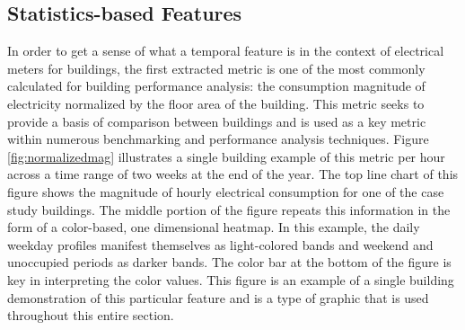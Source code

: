 \subsection{Statistics-based Features}
\label{sec:statisticsfeatures}

In order to get a sense of what a temporal feature is in the context of electrical meters for buildings, the first extracted metric is one of the most commonly calculated for building performance analysis: the consumption magnitude of electricity normalized by the floor area of the building. This metric seeks to provide a basis of comparison between buildings and is used as a key metric within numerous benchmarking and performance analysis techniques. Figure \ref{fig:normalizedmag} illustrates a single building example of this metric per hour across a time range of two weeks at the end of the year. The top line chart of this figure shows the magnitude of hourly electrical consumption for one of the case study buildings. The middle portion of the figure repeats this information in the form of a color-based, one dimensional heatmap. In this example, the daily weekday profiles manifest themselves as light-colored bands and weekend and unoccupied periods as darker bands. The color bar at the bottom of the figure is key in interpreting the color values. This figure is an example of a single building demonstration of this particular feature and is a type of graphic that is used throughout this entire section.